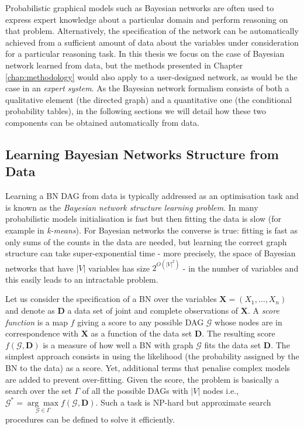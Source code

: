 Probabilistic graphical models such as Bayesian networks are often used to express expert knowledge about a particular domain and perform reasoning on that problem. 
Alternatively, the specification of the network can be automatically achieved from a sufficient amount of data about the variables under consideration for a particular reasoning task. 
In this thesis we focus on the case of Bayesian network learned from data, but the methods presented in Chapter \ref{chap:methodology} would also apply to a user-designed network, as would be the case in an \textit{expert system}. 
As the Bayesian network formalism consists of both a qualitative element (the directed graph) and a quantitative one (the conditional probability tables), in the following sections we will detail how these two components can be obtained automatically from data.

\subsection{Learning Bayesian Networks Structure from Data} \label{subsec:learning-bn-structure} 
Learning a BN DAG from data is typically addressed as an optimisation task and is known as the \textit{Bayesian network structure learning problem}. 
In many probabilistic models initialisation is fast but then fitting the data is slow (for example in \textit{k-means}).
For Bayesian networks the converse is true: fitting is fast as only sums of the counts in the data are needed, but learning the correct graph structure can take super-exponential time - more precisely, the space of Bayesian networks that have $|V|$ variables has size $2^{O(|V|^2)}$ \citep{berzan2012exploration} - in the number of variables and this easily leads to an intractable problem.

Let us consider the specification of a BN over the variables $\boldsymbol{X}=(X_1,\ldots,X_n)$ and denote as $\boldsymbol{D}$ a data set of joint and complete observations of $\boldsymbol{X}$. 
A \textit{score function} is a map $f$ giving a score to any possible DAG $\mathcal{G}$ whose nodes are in correspondence with $\boldsymbol{X}$ as a function of the data set $\boldsymbol{D}$. 
The resulting score $f(\mathcal{G},\boldsymbol{D})$ is a measure of how well a BN with graph $\mathcal{G}$ fits the data set $\boldsymbol{D}$.
The simplest approach consists in using the likelihood (the probability assigned by the BN to the data) as a score. 
Yet, additional terms that penalise complex models are added to prevent over-fitting.
Given the score, the problem is basically a search over the set $\Gamma$ of all the possible DAGs with $|V|$ nodes i.e., $\mathcal{G}^* = \underset{\mathcal{G} \in \Gamma}{\arg\max} f(\mathcal{G},\boldsymbol{D})$. 
Such a task is NP-hard but approximate search procedures can be defined to solve it efficiently.

